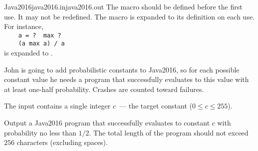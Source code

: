 \begin{problem}{Java2016}{java2016.in}{java2016.out}{\timeLimit}
The macro should be defined before the first use. It may not be redefined.
The macro is expanded to its definition on each use. For instance,
\\\verb|    a = ?  max ?|
\\\verb|    (a max a) / a|
\\is expanded to .

John is going to add probabilistic constants to Java2016, so for each
possible constant value he needs a program that successfully
evaluates to this value with at least one-half probability.
Crashes are counted toward failures. 

\InputFile

The input contains a single integer $c$~--- the target constant
($0 \le c \le 255$).  

\OutputFile

Output a Java2016 program that successfully evaluates to constant $c$ with probability
no less than $1/2$. The total length of the program should not exceed 
$256$ characters (excluding spaces).

\Examples

\begin{example}
%
%
\end{example}%
\end{problem}


